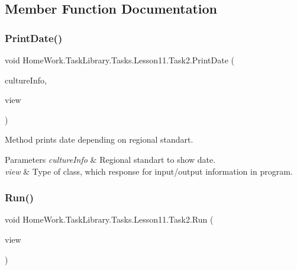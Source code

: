 \subsection{Member Function Documentation}
\mbox{\label{class_home_work_1_1_task_library_1_1_tasks_1_1_lesson11_1_1_task2_a1446cdbc61211414a8aa651c26a4bb0b}} 
\subsubsection{\texorpdfstring{PrintDate()}{PrintDate()}}
{\footnotesize\ttfamily void Home\+Work.\+Task\+Library.\+Tasks.\+Lesson11.\+Task2.\+Print\+Date (\begin{DoxyParamCaption}\item[{Culture\+Info}]{culture\+Info,  }\item[{I\+Information}]{view }\end{DoxyParamCaption})\hspace{0.3cm}{\ttfamily [private]}}



Method prints date depending on regional standart. 


\begin{DoxyParams}{Parameters}
{\em culture\+Info} & Regional standart to show date.\\
\hline
{\em view} & Type of class, which response for input/output information in program.\\
\hline
\end{DoxyParams}
\mbox{\label{class_home_work_1_1_task_library_1_1_tasks_1_1_lesson11_1_1_task2_ae21b65239ac0b09b9ce3c89dbf4d19ca}} 
\subsubsection{\texorpdfstring{Run()}{Run()}}
{\footnotesize\ttfamily void Home\+Work.\+Task\+Library.\+Tasks.\+Lesson11.\+Task2.\+Run (\begin{DoxyParamCaption}\item[{I\+Information}]{view }\end{DoxyParamCaption})}



